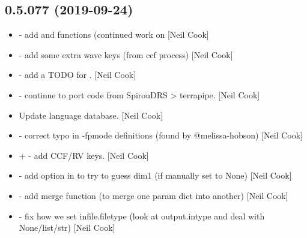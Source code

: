 \documentclass[a4paper,10pt,english]{report}
\begin{document}
\subsection{0.5.077 (2019-09-24)}
\label{\detokenize{misc/changelog:id65}}\begin{itemize}
\item {} 
 - add  and
 functions (continued work on  {[}Neil
Cook{]}

\item {} 
 - add some extra wave keys (from ccf process)
{[}Neil Cook{]}

\item {} 
 - add a TODO for . {[}Neil Cook{]}

\item {} 
 - continue to port code from SpirouDRS
\textendash{}\textgreater{} terrapipe. {[}Neil Cook{]}

\item {} 
Update language database. {[}Neil Cook{]}

\item {} 
 - correct typo in
 -fpmode definitions (found by @melissa-hobson) {[}Neil Cook{]}

\item {} 
 +  - add
CCF/RV keys. {[}Neil Cook{]}

\item {} 
 - add option in  to try
to guess dim1 (if manually set to None) {[}Neil Cook{]}

\item {} 
 - add merge function (to merge one
param dict into another) {[}Neil Cook{]}

\item {} 
 - fix how we set infile.filetype
(look at output.intype and deal with None/list/str) {[}Neil Cook{]}

\end{itemize}
\end{document}

